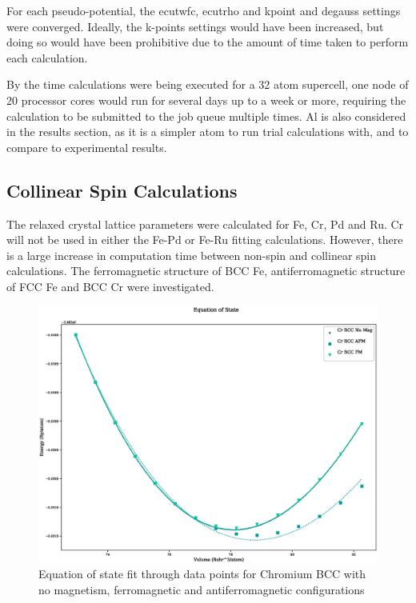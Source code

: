 For each pseudo-potential, the ecutwfc, ecutrho and kpoint and degauss settings were converged.  Ideally, the k-points settings would have been increased, but doing so would have been prohibitive due to the amount of time taken to perform each calculation.

By the time calculations were being executed for a 32 atom supercell, one node of 20 processor cores would run for several days up to a week or more, requiring the calculation to be submitted to the job queue multiple times.  Al is also considered in the results section, as it is a simpler atom to run trial calculations with, and to compare to experimental results.











\FloatBarrier
\subsection{Collinear Spin Calculations}

The relaxed crystal lattice parameters were calculated for Fe, Cr, Pd and Ru.  Cr will not be used in either the Fe-Pd or Fe-Ru fitting calculations.  However, there is a large increase in computation time between non-spin and collinear spin calculations.  The ferromagnetic structure of BCC Fe, antiferromagnetic structure of FCC Fe and BCC Cr were investigated. 

\FloatBarrier
\begin{figure}[h]
\begin{center}
\includegraphics[scale=0.45]{chapters/potentials_fe_pd_ru/qeeos_plots/cr-mag/eos.eps}
\caption{Equation of state fit through data points for Chromium BCC with no magnetism, ferromagnetic and antiferromagnetic configurations}
\label{fig:chromiumeos}
\end{center}
\end{figure}


